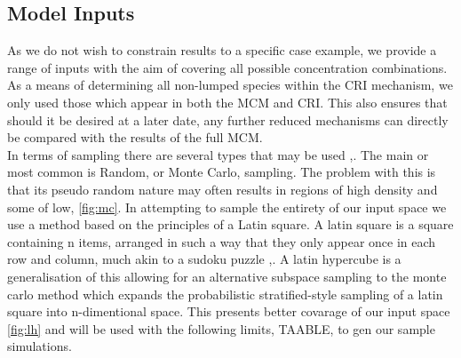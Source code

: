 \subsection{Model Inputs}
As we do not wish to constrain results to a specific case example, we provide a range of inputs with the aim of covering all possible concentration combinations. As a means of determining all non-lumped species within the CRI mechanism, we only used those which appear in both the MCM and CRI. This also ensures that should it be desired at a later date, any further reduced mechanisms can directly be compared with the results of the full MCM. \\

In terms of sampling there are several types that may be used ,\cite{sampling}. The main or most common is Random, or Monte Carlo, sampling. The problem with this is that its pseudo random nature may often results in regions of high density and some of low, \autoref{fig:mc}. In attempting to sample the entirety of our input space we use a method based on the principles of a Latin square. A latin square is a square containing n items, arranged in such a way that they only appear once in each row and column, much akin to a sudoku puzzle ,\cite{lsq}. A latin hypercube is a generalisation of this allowing for an alternative subspace sampling to the monte carlo method which expands the probabilistic stratified-style sampling of a latin square into n-dimentional space. This presents better covarage of our input space \autoref{fig:lh}  and will be used with the following limits, TAABLE, to gen our sample simulations.

